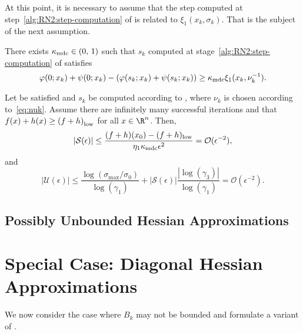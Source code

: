 \documentclass[smallextended]{svjour3}       %
\begin{document}
At this point, it is necessary to assume that the step computed at step~\ref{alg:RN2:step-computation} of  is related to \(\xi_1(x_k, \sigma_k)\).
That is the subject of the next assumption.

\begin{stepassumption}%
  \label{asm:step-computation}
  There exists \(\kappa_{\textup{mdc}} \in (0, \, 1)\) such that \(s_k\) computed at stage~\ref{alg:RN2:step-computation} of  satisfies
  \begin{equation}%
    \label{eq:sufficient-decrease}
    \varphi(0; x_k) + \psi(0; x_k) - (\varphi(s_k; x_k) + \psi(s_k; x_k)) \geq
    \kappa_{\textup{mdc}} \xi_1(x_k, \nu_k^{-1}).
  \end{equation}
\end{stepassumption}

\begin{theorem}%
  \label{thm:lm-complexity-bound}
  Let  be satisfied and \(s_k\) be computed according to , where \(\nu_k\) is chosen according to~\eqref{eq:nuk}.
  Assume there are infinitely many successful iterations and that \(f(x) + h(x) \geq {(f + h)}_{\textup{low}}\) for all \(x \in \R^n\).
  Then,
  \begin{equation}
    \label{eq:lm-bound-Seps}
    |\mathcal{S}(\epsilon)| \leq
    \frac{(f + h)(x_0) - (f + h)_{\textup{low}}}{\eta_1 \kappa_{\textup{mdc}} \epsilon^2} =
    \mathcal{O}(\epsilon^{-2}),
  \end{equation}
  and
  \begin{equation}
    \label{eq:lm-bound-Ueps}
    |\mathcal{U}(\epsilon)| \leq
    \frac{\log(\sigma_{\max} / \sigma_0)}{\log(\gamma_1)} + |\mathcal{S}(\epsilon)| \frac{|\log(\gamma_3)|}{\log(\gamma_1)}
    =
    \mathcal{O}(\epsilon^{-2}).
  \end{equation}
\end{theorem}

\subsection{Possibly Unbounded Hessian Approximations}%
\label{sec:B-unbounded}


\section{Special Case: Diagonal Hessian Approximations}%
\label{sec:dh}

We now consider the case where \(B_k\) may not be bounded and formulate a variant of \citep[Lemma~\(1\)]{leconte-orban-2023}.
\end{document}
